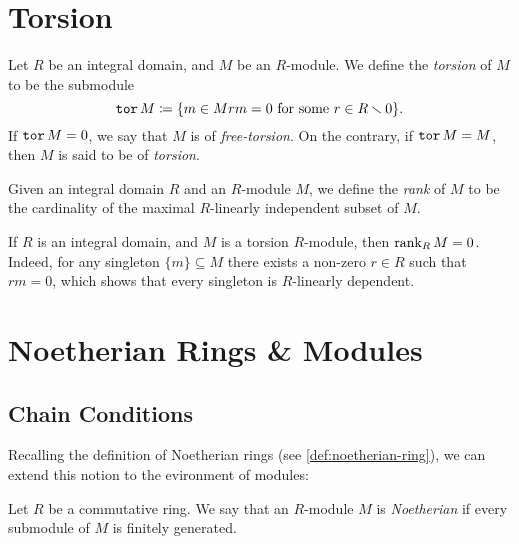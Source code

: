 \section{Torsion}

\begin{definition}[Torsion]
    \label{def:torsion-module}
    Let \(R\) be an integral domain, and \(M\) be an \(R\)-module. We define the
    \emph{torsion} of \(M\) to be the submodule
    \[
        \operatorname{\texttt{tor}} M \coloneq
        \{m \in M \relax r m = 0 \text{ for some } r \in R \smallsetminus 0\}.
    \]
    If \(\operatorname{\texttt{tor}} M = 0\), we say that \(M\) is of \emph{free-torsion}. On the
    contrary, if \(\operatorname{\texttt{tor}} M = M\), then \(M\) is said to be of \emph{torsion}.
\end{definition}

\begin{definition}[Rank]
    \label{def:rank-of-general-module}
    Given an integral domain \(R\) and an \(R\)-module \(M\), we define the
    \emph{rank} of \(M\) to be the cardinality of the maximal \(R\)-linearly
    independent subset of \(M\).
\end{definition}

\begin{example}
    \label{exp:torsion-module-has-rank-zero}
    If \(R\) is an integral domain, and \(M\) is a torsion \(R\)-module, then
    \(\operatorname{rank}_R M = 0\). Indeed, for any singleton \(\{m\} \subseteq M\) there exists
    a non-zero \(r \in R\) such that \(r m = 0\), which shows that every singleton
    is \(R\)-linearly dependent.
\end{example}

\section{Noetherian Rings \& Modules}

\subsection{Chain Conditions}

Recalling the definition of Noetherian rings (see \cref{def:noetherian-ring}),
we can extend this notion to the evironment of modules:

\begin{definition}
    \label{def:noetherian-module}
    Let \(R\) be a commutative ring. We say that an \(R\)-module \(M\) is
    \emph{Noetherian} if every submodule of \(M\) is finitely generated.
\end{definition}

